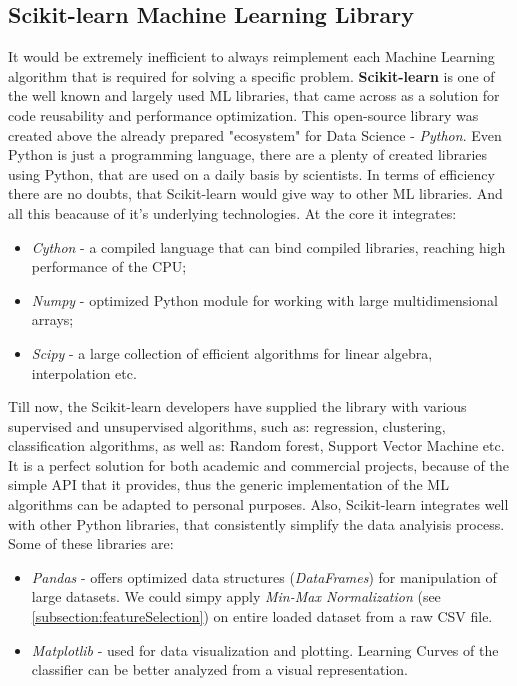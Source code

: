 \subsection{Scikit-learn Machine Learning Library}
It would be extremely inefficient to always reimplement each Machine Learning algorithm that is required for solving a specific problem. \textbf{Scikit-learn} is one of the well known and largely used ML libraries, that came across as a solution for code reusability and performance optimization. This open-source library was created above the already prepared "ecosystem" for Data Science - \textit{Python}. Even Python is just a programming language, there are a plenty of created libraries using Python, that are used on a daily basis by scientists. In terms of efficiency there are no doubts, that Scikit-learn would give way to other ML libraries. And all this beacause of it's underlying technologies. At the core it integrates:
	\begin{itemize}
		\item \textit{Cython} - a compiled language that can bind compiled libraries, reaching high performance of the CPU;
		\item \textit{Numpy} - optimized Python module for working with large multidimensional arrays;
		\item \textit{Scipy} - a large collection of efficient algorithms for linear algebra, interpolation etc.
	\end{itemize}
Till now, the Scikit-learn developers have supplied the library with various supervised and unsupervised algorithms, such as: regression, clustering, classification algorithms, as well as: Random forest, Support Vector Machine etc. It is a perfect solution for both academic and commercial projects, because of the simple API that it provides, thus the generic implementation of the ML algorithms can be adapted to personal purposes. Also, Scikit-learn integrates well with other Python libraries, that consistently simplify the data analyisis process. Some of these libraries are: 
	\begin{itemize}
		\item \textit{Pandas} - offers optimized data structures (\textit{DataFrames}) for manipulation of large datasets. We could simpy apply \textit{Min-Max Normalization} (see \ref{subsection:featureSelection}) on entire loaded dataset from a raw CSV file.
		\item \textit{Matplotlib} - used for data visualization and plotting. Learning Curves of the classifier can be better analyzed from a visual representation.
	\end{itemize}



